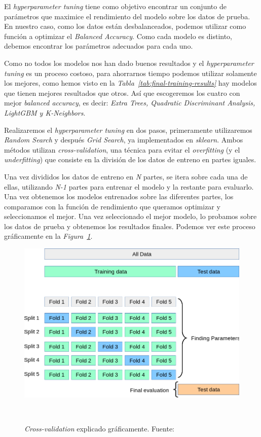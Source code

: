 El \textit{hyperparameter tuning} tiene como objetivo encontrar un conjunto de parámetros que maximice el rendimiento del modelo sobre los datos de prueba. En nuestro caso, como los datos están desbalanceados, podemos utilizar como función a optimizar el \textit{Balanced Accuracy}. Como cada modelo es distinto, debemos encontrar los parámetros adecuados para cada uno. 

Como no todos los modelos nos han dado buenos resultados y el \textit{hyperparameter tuning} es un proceso costoso, para ahorrarnos tiempo podemos utilizar solamente los mejores, como hemos visto en la \textit{Tabla\ \ref{tab:final-training-results}} hay modelos que tienen mejores resultados que otros. Así que escogeremos los cuatro con mejor \textit{balanced accuracy}, es decir: \textit{Extra Trees, Quadratic Discriminant Analysis, LightGBM y K-Neighbors}.

Realizaremos el \textit{hyperparameter tuning} en dos pasos, primeramente utilizaremos \textit{Random Search} y después \textit{Grid Search}, ya implementados en \textit{sklearn}.
Ambos métodos utilizan \textit{cross-validation}, una técnica para evitar el \textit{overfitting} (y el \textit{underfitting}) que consiste en la división de los datos de entreno en partes iguales. \cite{31Crossv20:online}

Una vez divididos los datos de entreno en \textit{N} partes, se itera sobre cada una de ellas, utilizando \textit{N-1} partes para entrenar el modelo y la restante para evaluarlo. Una vez obtenemos los modelos entrenados sobre las diferentes partes, los comparamos con la función de rendimiento que queramos optimizar y seleccionamos el mejor. Una vez seleccionado el mejor modelo, lo probamos sobre los datos de prueba y obtenemos los resultados finales. Podemos ver este proceso gráficamente en la \textit{Figura\ \ref{fig:cross-validation}}.

\begin{figure}[!h]
    \centering
    \includegraphics[width=0.7\linewidth]{media/images/cross-validation.png}
    \caption{\textit{Cross-validation} explicado gráficamente. Fuente:\ \cite{31Crossv20:online}}\ \label{fig:cross-validation}
\end{figure}


